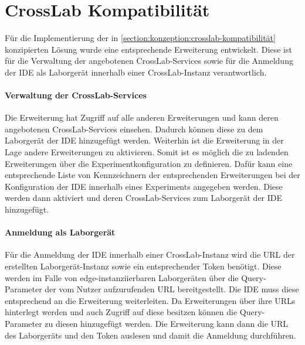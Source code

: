 \section{CrossLab Kompatibilität}\label{section:prototypische-implementierung:crosslab-kompatibilität}


Für die Implementierung der in \autoref{section:konzeption:crosslab-kompatibilität} konzipierten Lösung wurde eine entsprechende Erweiterung entwickelt. Diese ist für die Verwaltung der angebotenen CrossLab-Services sowie für die Anmeldung der IDE als Laborgerät innerhalb einer CrossLab-Instanz verantwortlich.

\paragraph{Verwaltung der CrossLab-Services}
Die Erweiterung hat Zugriff auf alle anderen Erweiterungen und kann deren angebotenen CrossLab-Services einsehen. Dadurch können diese zu dem Laborgerät der IDE hinzugefügt werden. Weiterhin ist die Erweiterung in der Lage andere Erweiterungen zu aktivieren. Somit ist es möglich die zu ladenden Erweiterungen über die Experimentkonfiguration zu definieren. Dafür kann eine entsprechende Liste von Kennzeichnern der entsprechenden Erweiterungen bei der Konfiguration der IDE innerhalb eines Experiments angegeben werden. Diese werden dann aktiviert und deren CrossLab-Services zum Laborgerät der IDE hinzugefügt.

\paragraph{Anmeldung als Laborgerät}
Für die Anmeldung der IDE innerhalb einer CrossLab-Instanz wird die URL der erstellten Laborgerät-Instanz sowie ein entsprechender Token benötigt. Diese werden im Falle von edge-instanziierbaren Laborgeräten über die Query-Parameter der vom Nutzer aufzurufenden URL bereitgestellt. Die IDE muss diese entsprechend an die Erweiterung weiterleiten. Da Erweiterungen über ihre URLs hinterlegt werden und auch Zugriff auf diese besitzen können die Query-Parameter zu diesen hinzugefügt werden. Die Erweiterung kann dann die URL des Laborgeräts und den Token auslesen und damit die Anmeldung durchführen.